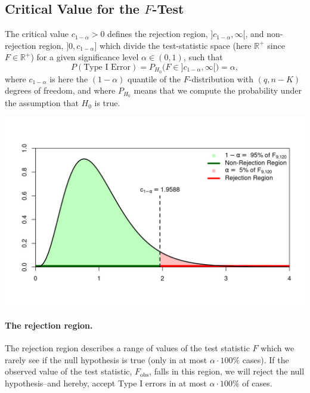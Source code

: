 \documentclass[
  14pt,
]{memoir}
\begin{document}
\hypertarget{critical-value-for-the-f-test}{%
\subsection{\texorpdfstring{Critical Value for the \(F\)-Test}{Critical Value for the F-Test}}\label{critical-value-for-the-f-test}}

The critical value \(c_{1-\alpha}>0\) defines the rejection region, \(]c_{1-\alpha},\infty[\), and non-rejection region, \(]0,c_{1-\alpha}]\) which divide the test-statistic space (here \(\mathbb{R}^+\) since \(F\in\mathbb{R}^+\)) for a given
significance level \(\alpha\in(0,1)\), such that
\[
P(\text{Type I Error})=P_{H_0}\Big(F\in]c_{1-\alpha},\infty[\Big)=\alpha,
\]
where \(c_{1-\alpha}\) is here the \((1-\alpha)\) quantile of the \(F\)-distribution with \((q,n-K)\) degrees of freedom, and where \(P_{H_0}\) means that we compute the probability under the assumption that \(H_0\) is true.

\begin{center}\includegraphics[width=1\textwidth]{figure/minimal-unnamed-chunk-64-1} \end{center}

\paragraph*{The rejection region.}

The rejection region describes a range of values of the test statistic \(F\) which we rarely see if the null hypothesis is true (only in at most \(\alpha \cdot 100\%\) cases). If the observed value of the test statistic, \(F_{\text{obs}}\), falls in this region, we will reject the null hypothesis--and hereby, accept Type I errors in at most \(\alpha \cdot 100\%\) of cases.
\end{document}

